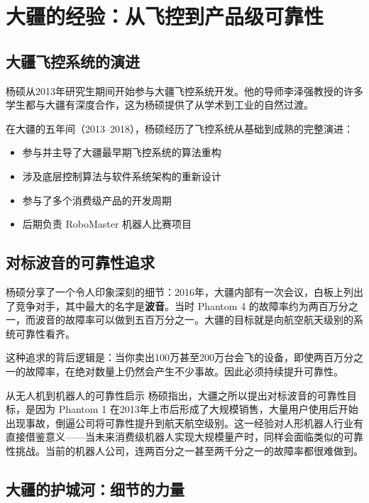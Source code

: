 \section{大疆的经验：从飞控到产品级可靠性}

\subsection{大疆飞控系统的演进}

杨硕从2013年研究生期间开始参与大疆飞控系统开发。他的导师李泽强教授的许多学生都与大疆有深度合作，这为杨硕提供了从学术到工业的自然过渡。

在大疆的五年间（2013--2018），杨硕经历了飞控系统从基础到成熟的完整演进：
\begin{itemize}
    \item 参与并主导了大疆最早期飞控系统的算法重构
    \item 涉及底层控制算法与软件系统架构的重新设计
    \item 参与了多个消费级产品的开发周期
    \item 后期负责 RoboMaster 机器人比赛项目
\end{itemize}

\subsection{对标波音的可靠性追求}

杨硕分享了一个令人印象深刻的细节：2016年，大疆内部有一次会议，白板上列出了竞争对手，其中最大的名字是\textbf{波音}。当时 Phantom 4 的故障率约为两百万分之一，而波音的故障率可以做到五百万分之一。大疆的目标就是向航空航天级别的系统可靠性看齐。

这种追求的背后逻辑是：当你卖出100万甚至200万台会飞的设备，即使两百万分之一的故障率，在绝对数量上仍然会产生不少事故。因此必须持续提升可靠性。

\begin{importantbox}{从无人机到机器人的可靠性启示}
杨硕指出，大疆之所以提出对标波音的可靠性目标，是因为 Phantom 1 在2013年上市后形成了大规模销售，大量用户使用后开始出现事故，倒逼公司将可靠性提升到航天航空级别。这一经验对人形机器人行业有直接借鉴意义——当未来消费级机器人实现大规模量产时，同样会面临类似的可靠性挑战。当前的机器人公司，连两百分之一甚至两千分之一的故障率都很难做到。
\end{importantbox}

\subsection{大疆的护城河：细节的力量}

